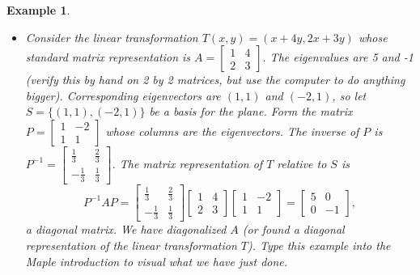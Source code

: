 \documentclass[10pt]{article}
\theoremstyle{plain}
\theoremstyle{box}
\newtheorem{example}{Example}
\begin{document}
\begin{example}
\begin{itemize}
\item
Consider the linear transformation $T(x,y) = (x+4y,2x+3y)$ whose standard matrix representation is
$A=  
\begin{bmatrix}
 1 & 4 \\
 2 & 3
\end{bmatrix} 
$. The eigenvalues are 5 and -1 (verify this by hand on 2 by 2 matrices, but use the computer to do anything bigger). Corresponding eigenvectors are $(1,1)$ and $(-2,1)$, so let $S=\{(1,1),(-2,1)\}$ be a basis for the plane.  Form the matrix 
$P=
\begin{bmatrix}
 1 & -2 \\
 1 & 1
\end{bmatrix} 
$ whose columns are the eigenvectors. The inverse of $P$ is 
$P^{-1} = 
\begin{bmatrix}
 \frac{1}{3} & \frac{2}{3} \\
 -\frac{1}{3} & \frac{1}{3}
\end{bmatrix} 
$. The matrix representation of $T$ relative to $S$ is 
$$
P^{-1}AP=\begin{bmatrix}
 \frac{1}{3} & \frac{2}{3} \\
 -\frac{1}{3} & \frac{1}{3}
\end{bmatrix} 
 \begin{bmatrix}
 1 & 4 \\
 2 & 3
\end{bmatrix} 
\begin{bmatrix}
 1 & -2 \\
 1 & 1
\end{bmatrix} 
=
\begin{bmatrix}
 5 & 0 \\
 0 & -1
\end{bmatrix} 
,$$ a diagonal matrix.  We have diagonalized $A$ (or found a diagonal representation of the linear transformation $T$). Type this example into the Maple introduction to visual what we have just done.
 

\end{itemize}
\end{example}
\end{document}
